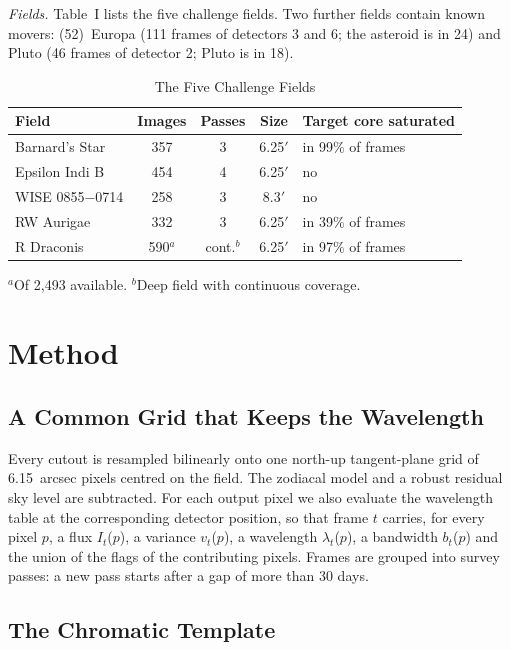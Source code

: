 \documentclass[conference]{IEEEtran}
\begin{document}
\emph{Fields.} Table~I lists the five challenge fields. Two further fields contain known movers: (52)~Europa (111 frames of detectors 3 and 6; the asteroid is in 24) and Pluto (46 frames of detector 2; Pluto is in 18).

\begin{table}[t]
\caption{The Five Challenge Fields}
\label{tab:fields}
\centering
\footnotesize
\begin{tabular}{@{}lcccl@{}}
\toprule
Field & Images & Passes & Size & Target core saturated \\
\midrule
Barnard's Star & 357 & 3 & 6.25$'$ & in 99\% of frames \\
Epsilon Indi B & 454 & 4 & 6.25$'$ & no \\
WISE 0855$-$0714 & 258 & 3 & 8.3$'$ & no \\
RW Aurigae & 332 & 3 & 6.25$'$ & in 39\% of frames \\
R Draconis & 590$^{a}$ & cont.$^{b}$ & 6.25$'$ & in 97\% of frames \\
\bottomrule
\end{tabular}
\par\vspace{3pt}
\parbox{\linewidth}{\scriptsize $^{a}$Of 2,493 available. $^{b}$Deep field with continuous coverage.}
\end{table}

\section{Method}

\subsection{A Common Grid that Keeps the Wavelength}

Every cutout is resampled bilinearly onto one north-up tangent-plane grid of 6.15~arcsec pixels centred on the field. The zodiacal model and a robust residual sky level are subtracted. For each output pixel we also evaluate the wavelength table at the corresponding detector position, so that frame $t$ carries, for every pixel $p$, a flux $I_{t}$($p$), a variance $v_{t}$($p$), a wavelength $\lambda_{t}$($p$), a bandwidth $b_{t}$($p$) and the union of the flags of the contributing pixels. Frames are grouped into survey passes: a new pass starts after a gap of more than 30 days.

\subsection{The Chromatic Template}
\end{document}
